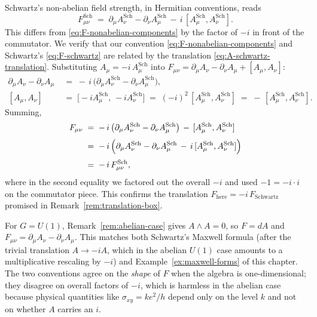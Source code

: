 \begin{remark}\label{rem:schwartz-comparison}
Schwartz's non-abelian field strength, in Hermitian conventions, reads
\begin{equation}\label{eq:F-schwartz}
F_{\mu\nu}^{\mathrm{Sch}} \;=\; \partial_\mu A_\nu^{\mathrm{Sch}} - \partial_\nu A_\mu^{\mathrm{Sch}} \,-\, i\, [A_\mu^{\mathrm{Sch}}, A_\nu^{\mathrm{Sch}}].
\end{equation}
This differs from \eqref{eq:F-nonabelian-components} by the factor of $-i$ in front of the commutator. We verify that our convention \eqref{eq:F-nonabelian-components} and Schwartz's \eqref{eq:F-schwartz} are related by the translation \eqref{eq:A-schwartz-translation}. Substituting $A_\mu = -i\, A_\mu^{\mathrm{Sch}}$ into $F_{\mu\nu} = \partial_\mu A_\nu - \partial_\nu A_\mu + [A_\mu, A_\nu]$:
\begin{align*}
\partial_\mu A_\nu - \partial_\nu A_\mu &\;=\; -\,i\,\bigl(\partial_\mu A_\nu^{\mathrm{Sch}} - \partial_\nu A_\mu^{\mathrm{Sch}}\bigr), \\[1mm]
[A_\mu, A_\nu] &\;=\; \bigl[-i A_\mu^{\mathrm{Sch}},\, -i A_\nu^{\mathrm{Sch}}\bigr] \;=\; (-i)^2\,[A_\mu^{\mathrm{Sch}}, A_\nu^{\mathrm{Sch}}] \;=\; -\,[A_\mu^{\mathrm{Sch}}, A_\nu^{\mathrm{Sch}}].
\end{align*}
Summing,
\begin{align*}
F_{\mu\nu} &\;=\; -\,i\,\bigl(\partial_\mu A_\nu^{\mathrm{Sch}} - \partial_\nu A_\mu^{\mathrm{Sch}}\bigr) \,-\, [A_\mu^{\mathrm{Sch}}, A_\nu^{\mathrm{Sch}}] \\[1mm]
&\;=\; -\,i\,\Bigl(\partial_\mu A_\nu^{\mathrm{Sch}} - \partial_\nu A_\mu^{\mathrm{Sch}} \,-\, i\,[A_\mu^{\mathrm{Sch}}, A_\nu^{\mathrm{Sch}}]\Bigr) \\[1mm]
&\;=\; -\,i\,F_{\mu\nu}^{\mathrm{Sch}},
\end{align*}
where in the second equality we factored out the overall $-i$ and used $-1 = -i \cdot i$ on the commutator piece. This confirms the translation $F_{\mathrm{here}} = -i\,F_{\mathrm{Schwartz}}$ promised in Remark~\ref{rem:translation-box}.
\end{remark}

\begin{example}\label{ex:abelian-F-check}
For $G = U(1)$, Remark~\ref{rem:abelian-case} gives $A \wedge A = 0$, so $F = dA$ and $F_{\mu\nu} = \partial_\mu A_\nu - \partial_\nu A_\mu$. This matches both Schwartz's Maxwell formula (after the trivial translation $A \to -iA$, which in the abelian $U(1)$ case amounts to a multiplicative rescaling by $-i$) and Example~\ref{ex:maxwell-forms} of this chapter. The two conventions agree on the \emph{shape} of $F$ when the algebra is one-dimensional; they disagree on overall factors of $-i$, which is harmless in the abelian case because physical quantities like $\sigma_{xy} = ke^2/h$ depend only on the level $k$ and not on whether $A$ carries an $i$.
\end{example}

